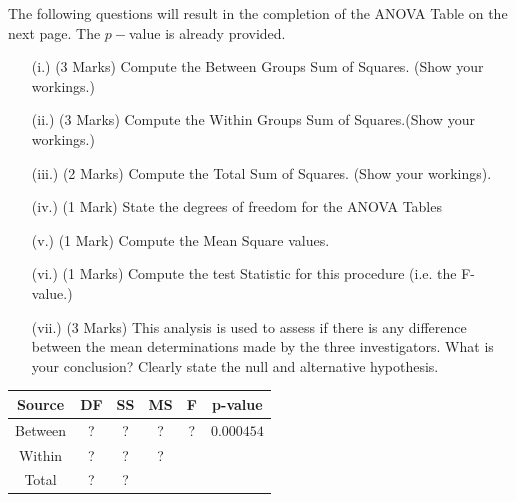 \documentclass[a4paper,12pt]{article}
\begin{document}
	\noindent The following questions will result in the completion of the ANOVA Table on the next page. The $p-$value is already provided.
	\begin{itemize}
		\item[(i.)](3 Marks) Compute the Between Groups Sum of Squares. (Show your workings.)
		\item[(ii.)](3 Marks) Compute the Within Groups Sum of Squares.(Show your workings.)
		\item[(iii.)](2 Marks) Compute the Total Sum of Squares. (Show your workings).
		\item[(iv.)] (1 Mark) State the degrees of freedom for the ANOVA Tables
		\item[(v.)] (1 Mark) Compute the Mean Square values.
		\item[(vi.)] (1 Marks) Compute the test Statistic for this procedure (i.e. the F-value.)
		\item[(vii.)] (3 Marks) This analysis is used to assess if there is any difference between the mean determinations made by the three investigators. What is your conclusion? Clearly state the null and alternative hypothesis.
	\end{itemize}
	\begin{center}
		\begin{tabular}{|c||c|c|c|c|c|}
			\hline Source & DF & SS & MS & F & p-value \\ \hline 
			\hline Between & \phantom{mak} ? \phantom{mak}  & \phantom{mak} ? \phantom{mak}  & \phantom{mak} ? \phantom{mak}  & \phantom{mak} ? \phantom{mak}  &  $0.000454$ \\ 
			\hline Within &  ? & ? & \phantom{mak} ? \phantom{mak}  &  &  \\ 
			\hline \hline Total & ? & ? &  &  &  \\ 
			\hline 
		\end{tabular}
	\end{center} 
\end{document}

